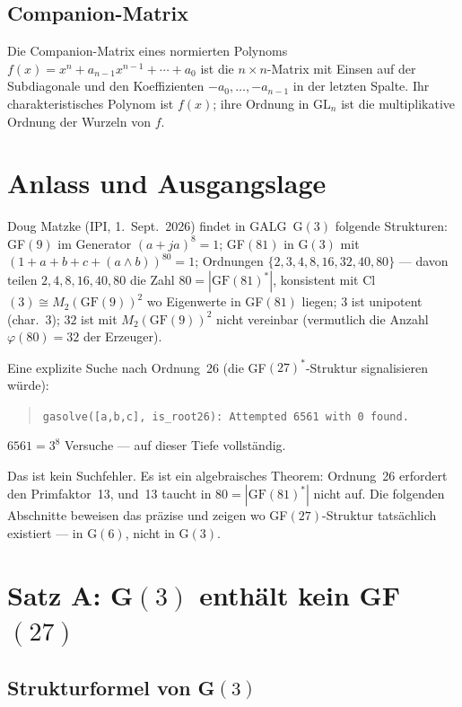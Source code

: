 \subsection*{Companion-Matrix}

Die Companion-Matrix eines normierten Polynoms $f(x) = x^n + a_{n-1}x^{n-1} + \cdots + a_0$
ist die $n \times n$-Matrix mit Einsen auf der Subdiagonale und den
Koeffizienten $-a_0, \ldots, -a_{n-1}$ in der letzten Spalte.
Ihr charakteristisches Polynom ist $f(x)$; ihre Ordnung in $\text{GL}_n$
ist die multiplikative Ordnung der Wurzeln von $f$.

\section{Anlass und Ausgangslage}

Doug Matzke (IPI, 1.~Sept.~2026) findet in GALG~G$(3)$ folgende Strukturen:
GF$(9)$ im Generator $(a+ja)^8 = 1$;
GF$(81)$ in G$(3)$ mit $(1+a+b+c+(a\wedge b))^{80} = 1$;
Ordnungen $\{2,3,4,8,16,32,40,80\}$ --- davon teilen $2,4,8,16,40,80$ die Zahl $80 = |\text{GF}(81)^*|$,
konsistent mit Cl$(3) \cong M_2(\text{GF}(9))^2$ wo Eigenwerte in GF$(81)$ liegen; $3$ ist unipotent (char.~3); $32$ ist mit $M_2(\text{GF}(9))^2$ nicht vereinbar (vermutlich die Anzahl $\varphi(80) = 32$ der Erzeuger).

Eine explizite Suche nach Ordnung~26 (die GF$(27)^*$-Struktur signalisieren würde):
\begin{quote}
\texttt{gasolve([a,b,c], is\_root26): Attempted 6561 with 0 found.}
\end{quote}
$6561 = 3^8$ Versuche --- auf dieser Tiefe vollständig.

Das ist kein Suchfehler. Es ist ein algebraisches Theorem: Ordnung~26 erfordert
den Primfaktor~13, und~13 taucht in $80 = |\text{GF}(81)^*|$ nicht auf.
Die folgenden Abschnitte beweisen das präzise und zeigen wo
GF$(27)$-Struktur tatsächlich existiert --- in G$(6)$, nicht in G$(3)$.

\section{Satz A: G$(3)$ enthält kein GF$(27)$}

\subsection{Strukturformel von G$(3)$}

